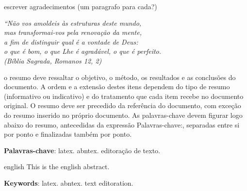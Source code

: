 \documentclass[
12pt,				%
openright,			%
twoside,			%
a4paper,			%
english,			%
french,				%
spanish,			%
brazil				%
]{abntex2}
\begin{document}
	\begin{agradecimentos}
	escrever agradecimentos (um paragrafo para cada?)
		
	\end{agradecimentos}
	
	\begin{epigrafe}
		\vspace*{\fill}
		\begin{flushright}
			\textit{``Não vos amoldeis às estruturas deste mundo, \\
				mas transformai-vos pela renovação da mente, \\
				a fim de distinguir qual é a vontade de Deus: \\
				o que é bom, o que Lhe é agradável, o que é perfeito.\\
				(Bíblia Sagrada, Romanos 12, 2)}
		\end{flushright}
	\end{epigrafe}
	
	
	\setlength{\absparsep}{18pt} %
	\begin{resumo}
		o resumo deve ressaltar o
		objetivo, o método, os resultados e as conclusões do documento. A ordem e a extensão
		destes itens dependem do tipo de resumo (informativo ou indicativo) e do
		tratamento que cada item recebe no documento original. O resumo deve ser
		precedido da referência do documento, com exceção do resumo inserido no
		próprio documento. As palavras-chave devem figurar logo abaixo do
		resumo, antecedidas da expressão Palavras-chave:, separadas entre si por
		ponto e finalizadas também por ponto.
		
		\textbf{Palavras-chave}: latex. abntex. editoração de texto.
	\end{resumo}
	
	\begin{resumo}[abstract]
		\begin{otherlanguage*}{english}
			This is the english abstract.
			
			\vspace{\onelineskip}
			
			\noindent 
			\textbf{Keywords}: latex. abntex. text editoration.
		\end{otherlanguage*}
	\end{resumo}
	
\end{document}
